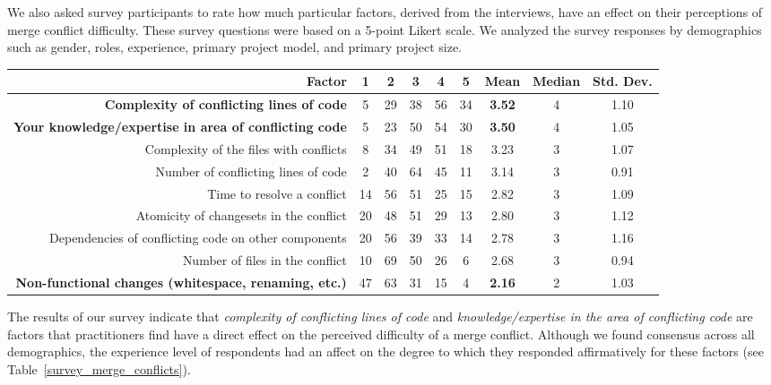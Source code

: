 We also asked survey participants to rate how much particular factors, derived from the interviews, have an effect on their perceptions of merge conflict difficulty.
These survey questions were based on a 5-point Likert scale.
We analyzed the survey responses by demographics such as gender, roles, experience, primary project model, and primary project size.

\begin{table*}[!]
\renewcommand{\arraystretch}{1.3}
\caption{Factors of Merge Conflict Difficulty from Survey}
\label{survey_merge_conflicts}
\centering
\begin{tabularx}{0.9\textwidth}{r | *5{c} | *3{c}}

\toprule
	Factor & 1 & 2 & 3 & 4 & 5 & Mean & Median & Std. Dev. \\
\midrule
	\textbf{Complexity of conflicting lines of code} & 5 & 29 & 38 & 56 & 34 & \textbf{3.52} & 4 & 1.10 \\
	\textbf{Your knowledge/expertise in area of conflicting code} & 5 & 23 & 50 & 54 & 30 & \textbf{3.50} & 4 & 1.05 \\
	Complexity of the files with conflicts & 8 & 34 & 49 & 51 & 18 & 3.23 & 3 & 1.07 \\
	Number of conflicting lines of code & 2 & 40 & 64 & 45 & 11 & 3.14 & 3 & 0.91 \\
	Time to resolve a conflict & 14 & 56 & 51 & 25 & 15 & 2.82 & 3 & 1.09 \\
	Atomicity of changesets in the conflict & 20 & 48 & 51 & 29 & 13 & 2.80 & 3 & 1.12 \\
	Dependencies of conflicting code on other components & 20 & 56 & 39 & 33 & 14 & 2.78 & 3 & 1.16 \\
	Number of files in the conflict & 10 & 69 & 50 & 26 & 6 & 2.68 & 3 & 0.94 \\
	\textbf{Non-functional changes (whitespace, renaming, etc.)} & 47 & 63 & 31 & 15 & 4 & \textbf{2.16} & 2 & 1.03 \\
\bottomrule
\end{tabularx}
\end{table*}

The results of our survey indicate that \textit{complexity of conflicting lines of code} and \textit{knowledge/expertise in the area of conflicting code} are factors that practitioners find have a direct effect on the perceived difficulty of a merge conflict.
Although we found consensus across all demographics, the experience level of respondents had an affect on the degree to which they responded affirmatively for these factors (see Table~\ref{survey_merge_conflicts}).

